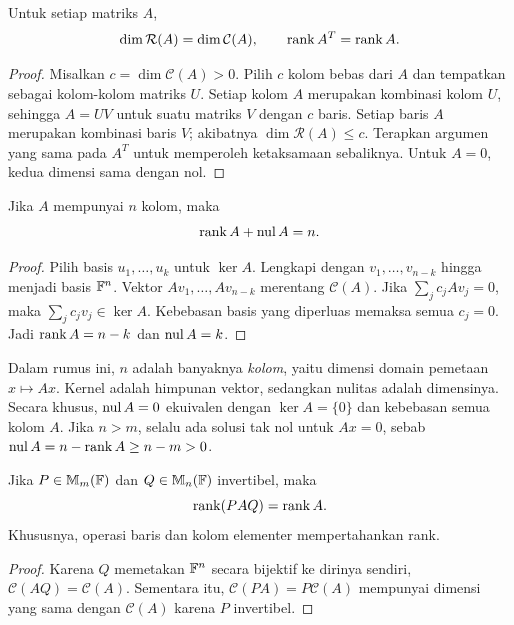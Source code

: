 \begin{teorema}
    Untuk setiap matriks $A$,
    \[
        \dim\mathcal R(A)=\dim\mathcal C(A),\qquad
        \operatorname{rank} A^T=\operatorname{rank} A.
    \]
\end{teorema}
\begin{proof}
    Misalkan $c=\dim\mathcal C(A)>0$. Pilih $c$ kolom bebas dari $A$
    dan tempatkan sebagai kolom-kolom matriks $U$. Setiap kolom $A$
    merupakan kombinasi kolom $U$, sehingga $A=UV$ untuk suatu matriks
    $V$ dengan $c$ baris. Setiap baris $A$ merupakan kombinasi baris $V$;
    akibatnya $\dim\mathcal R(A)\le c$.
    Terapkan argumen yang sama pada $A^T$ untuk memperoleh ketaksamaan
    sebaliknya. Untuk $A=0$, kedua dimensi sama dengan nol.
\end{proof}

\begin{teorema}
    Jika $A$ mempunyai $n$ kolom, maka
    \[
        \operatorname{rank} A+\operatorname{nul} A=n.
    \]
\end{teorema}
\begin{proof}
    Pilih basis $u_1,\ldots,u_k$ untuk $\ker A$.
    Lengkapi dengan $v_1,\ldots,v_{n-k}$ hingga menjadi basis $\mathbb{F}^n$.
    Vektor $Av_1,\ldots,Av_{n-k}$ merentang $\mathcal C(A)$.
    Jika $\sum_j c_jAv_j=0$, maka $\sum_j c_jv_j\in\ker A$.
    Kebebasan basis yang diperluas memaksa semua $c_j=0$.
    Jadi $\operatorname{rank} A=n-k$ dan $\operatorname{nul} A=k$.
\end{proof}

Dalam rumus ini, $n$ adalah banyaknya \emph{kolom}, yaitu dimensi
domain pemetaan $x\mapsto Ax$. Kernel adalah himpunan vektor, sedangkan
nulitas adalah dimensinya. Secara khusus, $\operatorname{nul} A=0$ ekuivalen dengan
$\ker A=\{0\}$ dan kebebasan semua kolom $A$.
Jika $n>m$, selalu ada solusi tak nol untuk $Ax=0$, sebab
$\operatorname{nul} A=n-\operatorname{rank} A\ge n-m>0$.

\begin{prop}
    \label{rank:invarian}
    Jika $P\in\mathbb{M}_m(\mathbb{F})$ dan $Q\in\mathbb{M}_n(\mathbb{F})$ invertibel, maka
    \[
        \operatorname{rank}(PAQ)=\operatorname{rank} A.
    \]
    Khususnya, operasi baris dan kolom elementer mempertahankan rank.
\end{prop}
\begin{proof}
    Karena $Q$ memetakan $\mathbb{F}^n$ secara bijektif ke dirinya sendiri,
    $\mathcal C(AQ)=\mathcal C(A)$. Sementara itu,
    $\mathcal C(PA)=P\mathcal C(A)$ mempunyai dimensi yang sama dengan
    $\mathcal C(A)$ karena $P$ invertibel.
\end{proof}

